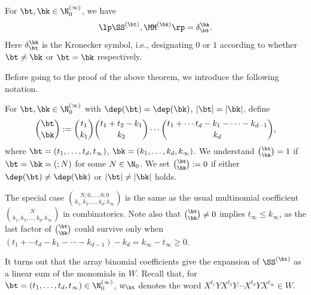 \begin{Theorem}[Duality] \label{orthogonality}
For $\bt, \bk\in \N_0^{(\infty)}$, we have
$$
\lp \SS^{(\bt)},\MM^{(\bk)}\rp=\delta_\bt^{\bk}.
$$
Here $\delta_\bt^{\bk}$ is the Kronecker symbol, i.e., designating $0$ or $1$
according to whether $\bt\ne\bk$ or $\bt=\bk$ respectively.
\end{Theorem}

Before going to the proof of the above theorem, we introduce the following
notation.

\begin{Definition}
For $\bt,\bk\in  \N_0^{(\infty)}$ with $\dep(\bt)=\dep(\bk)$, 
$|\bt|=|\bk|$, define
\begin{equation} \label{ArrayBino}
\binom{\bt}{\bk}:=
\binom{t_1}{k_1}
\binom{t_1+t_2-k_1}{k_2}
\cdots
\binom{t_1+\cdots t_d-k_1-\cdots-k_{d-1}}{k_d},
\end{equation}
where $\bt=(t_1,\dots,t_d,t_\infty)$,
$\bk=(k_1,\dots,k_d,k_\infty)$.
We understand $\binom{\bt}{\bk}=1$ if
$\bt=\bk=(;N)$ for some $N\in \N_0$.
We set $\binom{\bt}{\bk}:=0$ if either $\dep(\bt)\ne\dep(\bk)$ or 
$|\bt|\ne|\bk|$ holds.
\end{Definition}

\begin{Remark} 
\label{rem2.6}
The special case $\binom{N,0,\dots,0;0}{k_1,k_2,\dots,k_d;k_\infty}$ 
is the same as the usual multinomial coefficient 
$\binom{N}{k_1,k_2,\dots,k_d,k_\infty}$ in combinatorics.
Note also that $\binom{\bt}{\bk}\ne 0$ implies $t_\infty\le k_\infty$,
as the last factor of $\binom{\bt}{\bk}$ could survive only when 
$(t_1+\cdots t_d-k_1-\cdots-k_{d-1})-k_d=k_\infty-t_\infty\ge 0$.
\end{Remark}

It turns out that the array binomial coefficients give
the expansion of $\SS^{(\bt)}$ as a linear sum of the monomials in $W$.
Recall that, for $\bt=(t_1,\dots,t_d,t_\infty)\in  \N_0^{(\infty)}$, 
$w_\bt$ denotes the word $X^{t_1}YX^{t_2}Y\cdots X^{t_d}YX^{t_\infty}\in W$.




